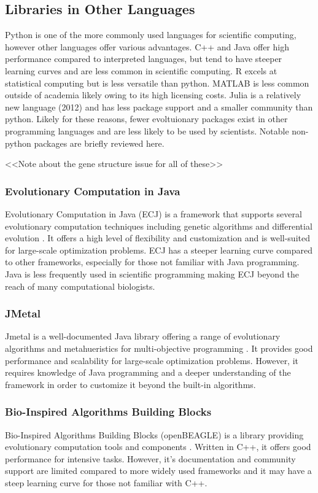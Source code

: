 \documentclass[12pt]{report}
\begin{document}
\subsection{Libraries in Other Languages}
Python is one of the more commonly used languages for scientific computing, however other languages offer various advantages. C++ and Java offer high performance compared to interpreted languages, but tend to have steeper learning curves and are less common in scientific computing. R excels at statistical computing but is less versatile than python. MATLAB is less common outside of academia likely owing to its high licensing costs. Julia is a relatively new language (2012) and has less package support and a smaller community than python. Likely for these reasons, fewer evoltuionary packages exist in other programming languages and are less likely to be used by scientists. Notable non-python packages are briefly reviewed here.

<<Note about the gene structure issue for all of these>>

\subsubsection{Evolutionary Computation in Java}
Evolutionary Computation in Java (ECJ) is a framework that supports several evolutionary computation techniques including genetic algorithms and differential evolution \cite{Luke1998ECJSoftware}. It offers a high level of flexibility and customization and is well-suited for large-scale optimization problems. 
ECJ has a steeper learning curve compared to other frameworks, especially for those not familiar with Java programming. Java is less frequently used in scientific programming making ECJ beyond the reach of many computational biologists. 

\subsubsection{JMetal}
Jmetal is a well-documented Java library offering a range of evolutionary algorithms and metahueristics for multi-objective programming \cite{Durillo2011}. It provides good performance and scalability for large-scale optimization problems. However, it requires knowledge of Java programming and a deeper understanding of the framework in order to customize it beyond the built-in algorithms. 

\subsubsection{Bio-Inspired Algorithms Building Blocks}
Bio-Inspired Algorithms Building Blocks (openBEAGLE) is a library providing evolutionary computation tools and components \cite{Gagne2006}. Written in C++, it offers good performance for  intensive tasks. However, it's documentation and community support are limited compared to more widely used frameworks and it may have a steep learning curve for those not familiar with C++.
\end{document}
